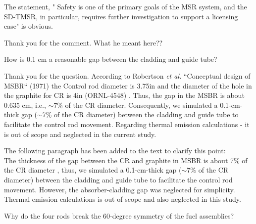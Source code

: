 \documentclass[answers,11pt]{exam}
\begin{document}
\begin{questions}
        \question  The statement, " Safety is one of the primary goals of the MSR system, and the SD-TMSR, in particular, requires further investigation to support a licensing case" is obvious.
        
        \begin{solution}
             
              Thank you for the comment. What he meant here?? 
              
               
               
                
                
                
        \end{solution}

        \question How is 0.1 cm a reasonable gap between the cladding and guide tube?
        \begin{solution}
        	
Thank you for the question. According to Robertson \emph{et al.} ``Conceptual design of MSBR`` (1971) the Control rod diameter is 3.75in and the diameter of the hole in the graphite for CR is 4in (ORNL-4548) \cite{robertson_conceptual_1971}. Thus, the gap in the MSBR is about 0.635 cm, i.e., $\sim$7\% of the CR diameter. Consequently, we simulated a 0.1-cm-thick gap ($\sim$7\% of the CR diameter) between the cladding and guide tube to facilitate the control rod movement. Regarding thermal emission calculations - it is out of scope and neglected in the current study.

The following paragraph has been added to the text to clarify this point:\\

The thickness of the gap between the CR and graphite in MSBR is about 7\% of the CR diameter \cite{robertson_conceptual_1971}, thus, we simulated a 0.1-cm-thick gap ($\sim$7\% of the CR diameter) between the cladding and guide tube to facilitate the control rod movement. However, the absorber-cladding gap was neglected for simplicity. Thermal emission calculations is out of scope and also neglected in this study.



        \end{solution}

        \question Why do the four rods break the 60-degree symmetry of the fuel assemblies?
        

\end{questions}
\end{document}
